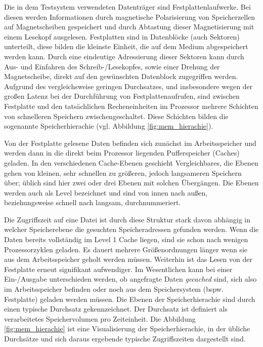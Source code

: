 \documentclass[
	twoside,
	12pt,
	a4paper,
	BCOR10mm,
	DIV14,
	listof=totoc,
	bibliography=totoc,
	headsepline
]{scrreprt}
\begin{document}
Die in dem Testsystem verwendeten Datenträger sind Festplattenlaufwerke. Bei diesen werden Informationen durch magnetische Polarisierung von Speicherzellen auf Magnetscheiben gespeichert und durch Abtastung dieser Magnetisierung mit einem Lesekopf ausgelesen.
Festplatten sind in Datenblöcke (auch Sektoren) unterteilt, diese bilden die kleinste Einheit, die auf dem Medium abgespeichert werden kann. Durch eine eindeutige Adressierung dieser Sektoren kann durch Aus- und Einfahren des Schreib-/Lesekopfes, sowie einer Drehung der Magnetscheibe, direkt auf den gewünschten Datenblock zugegriffen werden.
Aufgrund des vergleichsweise geringen Durchsatzes, und insbesondere wegen der großen Latenz bei der Durchführung von Festplattenaufrufen, sind zwischen Festplatte und den tatsächlichen Recheneinheiten im Prozessor mehrere Schichten von schnelleren Speichern zwischengeschaltet. Diese Schichten bilden die sogenannte Speicherhierachie (vgl. Abbildung \ref{fig:mem_hierachie}).\medskip

Von der Festplatte gelesene Daten befinden sich zunächst im Arbeitsspeicher und werden dann in die direkt beim Prozessor liegenden Pufferspeicher (Caches) geladen.
In den verschiedenen Cache-Ebenen geschieht Vergleichbares, die Ebenen gehen von kleinen, sehr schnellen zu größeren, jedoch langsameren Speichern über; üblich sind hier zwei oder drei Ebenen mit solchen Übergängen. Die Ebenen werden auch als Level bezeichnet und sind von innen nach außen, beziehungsweise schnell nach langsam, durchnummeriert. 
\medskip

Die Zugriffszeit auf eine Datei ist durch diese Struktur stark davon abhängig in welcher Speicherebene die gesuchten Speicheradressen gefunden werden. Wenn die Daten bereits vollständig im Level 1 Cache liegen, sind sie schon nach wenigen Prozessorzyklen geladen. Es dauert mehrere Größenordnungen länger wenn sie aus dem Arbeitsspeicher geholt werden müssen. Weiterhin ist das Lesen von der Festplatte erneut signifikant aufwendiger. Im Wesentlichen kann bei einer Ein-/Ausgabe unterschieden werden, ob angefragte Daten \textit{gecached} sind, sich also im Arbeitsspeicher befinden oder noch aus dem Speichersystem (bspw. Festplatte) geladen werden müssen.
Die Ebenen der Speicherhierachie sind durch einen typische Durchsatz gekennzeichnet. Der Durchsatz ist definiert als verarbeitetes Speichervolumen pro Zeiteinheit. Die Abbildung \ref{fig:mem_hierachie} ist eine Visualisierung der Speicherhierachie, in der übliche Durchsätze und sich daraus ergebende typische Zugriffszeiten dargestellt sind.
\end{document}
